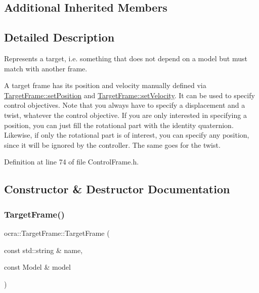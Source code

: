 \subsection*{Additional Inherited Members}


\subsection{Detailed Description}
Represents a \textquotesingle{}target\textquotesingle{}, i.\+e. something that does not depend on a model but must match with another frame. 

A target frame has its position and velocity manually defined via \hyperlink{classocra_1_1TargetFrame_a760081f3ae88a43ff91dc6a746083286}{Target\+Frame\+::set\+Position} and \hyperlink{classocra_1_1TargetFrame_aff778ddb4526e90b927ec12bda52e8d6}{Target\+Frame\+::set\+Velocity}. It can be used to specify control objectives. Note that you always have to specify a displacement and a twist, whatever the control objective. If you are only interested in specifying a position, you can just fill the rotational part with the identity quaternion. Likewise, if only the rotational part is of interest, you can specify any position, since it will be ignored by the controller. The same goes for the twist. 

Definition at line 74 of file Control\+Frame.\+h.



\subsection{Constructor \& Destructor Documentation}
\hypertarget{classocra_1_1TargetFrame_ab7cf677c24a55434c4b285127235ae3c}{}\label{classocra_1_1TargetFrame_ab7cf677c24a55434c4b285127235ae3c} 
\subsubsection{\texorpdfstring{Target\+Frame()}{TargetFrame()}}
{\footnotesize\ttfamily ocra\+::\+Target\+Frame\+::\+Target\+Frame (\begin{DoxyParamCaption}\item[{const std\+::string \&}]{name,  }\item[{const Model \&}]{model }\end{DoxyParamCaption})}



